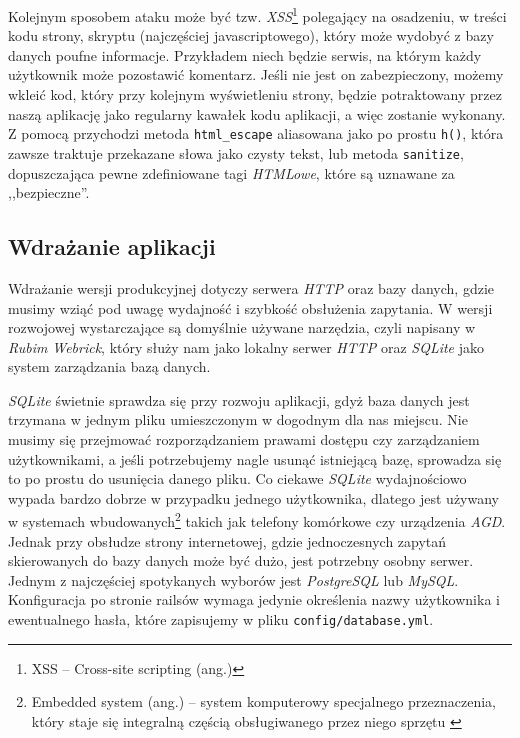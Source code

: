 \documentclass[12pt,twoside]{report}
\begin{document}
Kolejnym sposobem ataku może być tzw. \emph{XSS}\footnote{XSS -- Cross-site scripting
(ang.)} polegający na osadzeniu, w treści kodu strony, skryptu (najczęściej
javascriptowego), który może wydobyć z bazy danych poufne informacje. Przykładem niech
będzie serwis, na którym każdy użytkownik może pozostawić komentarz. Jeśli nie jest on
zabezpieczony, możemy wkleić kod, który przy kolejnym wyświetleniu strony, będzie potraktowany
przez naszą aplikację jako regularny kawałek kodu aplikacji, a więc zostanie wykonany.\\
Z pomocą przychodzi metoda \texttt{html\_escape} aliasowana jako po prostu \texttt{h()},
która zawsze traktuje przekazane słowa jako czysty tekst, lub metoda \texttt{sanitize},
dopuszczająca pewne zdefiniowane tagi \emph{HTMLowe}, które są uznawane za ,,bezpieczne''.


\subsection{Wdrażanie aplikacji}
Wdrażanie wersji produkcyjnej dotyczy serwera \emph{HTTP} oraz bazy danych, gdzie musimy
wziąć pod uwagę wydajność i szybkość obsłużenia zapytania. W wersji rozwojowej
wystarczające są domyślnie używane narzędzia, czyli napisany w \emph{Rubim} \emph{Webrick},
który służy nam jako lokalny serwer \emph{HTTP} oraz \emph{SQLite} jako system
zarządzania bazą danych.


\emph{SQLite} świetnie sprawdza się przy rozwoju aplikacji, gdyż baza danych jest trzymana
w jednym pliku umieszczonym w dogodnym dla nas miejscu. Nie musimy się przejmować
rozporządzaniem prawami dostępu czy zarządzaniem użytkownikami, a jeśli potrzebujemy nagle
usunąć istniejącą bazę, sprowadza się to po prostu do usunięcia danego pliku.
Co ciekawe \emph{SQLite} wydajnościowo wypada bardzo dobrze w przypadku jednego
użytkownika, dlatego jest używany w systemach wbudowanych\footnote{Embedded system (ang.) --
system komputerowy specjalnego przeznaczenia, który staje się integralną częścią
obsługiwanego przez niego sprzętu \cite{embedded-system}} takich jak telefony komórkowe
czy urządzenia \emph{AGD}. Jednak przy obsłudze strony internetowej, gdzie jednoczesnych zapytań
skierowanych do bazy danych może być dużo, jest potrzebny osobny serwer. Jednym
z najczęściej spotykanych wyborów jest \emph{PostgreSQL} lub \emph{MySQL}. Konfiguracja
po stronie railsów wymaga jedynie określenia nazwy użytkownika i ewentualnego hasła, które
zapisujemy w pliku \texttt{config/database.yml}.
\end{document}
